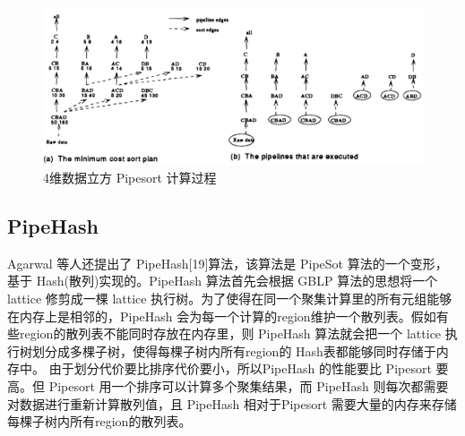 \begin{figure}[!htb]
\centering\includegraphics[width=5.5in]{picture/ch_current_research/pipesort} 
\caption{4维数据立方 Pipesort 计算过程}\label{pipesort} 
\end{figure} 

\subsection{PipeHash}

Agarwal 等人还提出了 PipeHash[19]算法，该算法是 PipeSot 算法的一个变形，基于 Hash(散列)实现的。PipeHash 算法首先会根据 GBLP 算法的思想将一个 lattice 修剪成一棵 lattice 执行树。为了使得在同一个聚集计算里的所有元组能够在内存上是相邻的，PipeHash 会为每一个计算的region维护一个散列表。假如有些region的散列表不能同时存放在内存里，则 PipeHash 算法就会把一个 lattice 执行树划分成多棵子树，使得每棵子树内所有region的 Hash表都能够同时存储于内存中。 由于划分代价要比排序代价要小，所以PipeHash 的性能要比 Pipesort 要高。但 Pipesort 用一个排序可以计算多个聚集结果，而 PipeHash 则每次都需要对数据进行重新计算散列值，且 PipeHash 相对于Pipesort 需要大量的内存来存储每棵子树内所有region的散列表。



